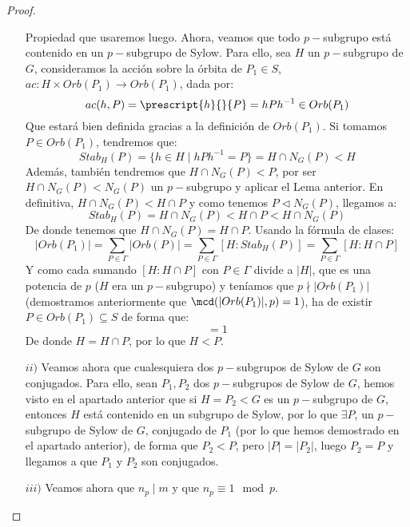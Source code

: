 \begin{teo}
\begin{proof}
\begin{enumerate}
                \noindent
                Propiedad que usaremos luego. Ahora, veamos que todo $p-$subgrupo está contenido en un $p-$subgrupo de Sylow. Para ello, sea $H$ un $p-$subgrupo de $G$, consideramos la acción sobre la órbita de $P_1\in S$, $ac:H\times Orb(P_1)\to Orb(P_1)$, dada por:
                \begin{equation*}
                    ac(h,P) = \prescript{h}{}{P} = hPh^{-1} \in Orb(P_1)
                \end{equation*}
                Que estará bien definida gracias a la definición de $Orb(P_1)$. Si tomamos \newline $P \in Orb(P_1)$, tendremos que:
                \begin{equation*}
                    Stab_H(P) = \{h\in H \mid hPh^{-1} = P\} = H\cap N_G(P) < H
                \end{equation*}
                Además, también tendremos que $H\cap N_G(P) < P$, por ser $H\cap N_G(P) < N_G(P)$ un $p-$subgrupo y aplicar el Lema anterior. En definitiva, $H\cap N_G(P) < H\cap P$ y como tenemos $P\lhd N_G(P)$, llegamos a:
                \begin{equation*}
                    Stab_H(P) = H\cap N_G(P) < H\cap P < H\cap N_G(P)
                \end{equation*}
                De donde tenemos que $H\cap N_G(P) = H \cap P$. Usando la fórmula de clases:
                \begin{equation*}
                    |Orb(P_1)| = \sum_{P\in \Gamma} |Orb(P)| = \sum_{P \in \Gamma} [H:Stab_H(P)] = \sum_{P\in \Gamma} [H:H\cap P]
                \end{equation*}
                Y como cada sumando $[H:H\cap P]$ con $P\in \Gamma$ divide a $|H|$, que es una potencia de $p$ ($H$ era un $p-$subgrupo) y teníamos que $p\nmid |Orb(P_1)|$ (demostramos anteriormente que $\mcd(|Orb(P_1)|,p) = 1$), ha de existir $P \in Orb(P_1)\subseteq S$ de forma que:
                \begin{equation*}
                    [H:H\cap P] = 1
                \end{equation*}
                De donde $H = H\cap P$, por lo que $H<P$.
            \item[$ii)$] Veamos ahora que cualesquiera dos $p-$subgrupos de Sylow de $G$ son conjugados. Para ello, sean $P_1,P_2$ dos $p-$subgrupos de Sylow de $G$, hemos visto en el apartado anterior que si $H = P_2<G$ es un $p-$subgrupo de $G$, entonces $H$ está contenido en un subgrupo de Sylow, por lo que $\exists P$, un $p-$subgrupo de Sylow de $G$, conjugado de $P_1$ (por lo que hemos demostrado en el apartado anterior), de forma que $P_2 < P$, pero $|P| = |P_2|$, luego $P_2 = P$ y llegamos a que $P_1$ y $P_2$ son conjugados.
            \item[$iii)$] Veamos ahora que $n_p\mid m$ y que $n_p\equiv 1 \mod p$.\newline


\end{enumerate}
\end{proof}
\end{teo}
